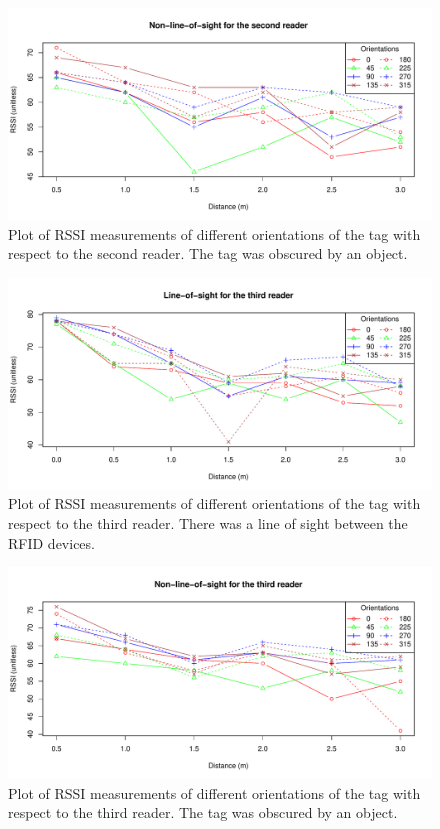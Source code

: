\begin{figure}[H]
	\begin{center}
		\includegraphics[width=1\textwidth]{figures/rssi_distance_3m_nlos_r2}
		\caption{Plot of RSSI measurements of different orientations of the tag with respect to the second reader. The tag was obscured by an object.}
	\end{center}
\end{figure}

\begin{figure}[H]
	\begin{center}
		\includegraphics[width=1\textwidth]{figures/rssi_distance_3m_los_r3}
		\caption{Plot of RSSI measurements of different orientations of the tag with respect to the third reader. There was  a line of sight between the RFID devices.}
	\end{center}
\end{figure}

\begin{figure}[H]
	\begin{center}
		\includegraphics[width=1\textwidth]{figures/rssi_distance_3m_nlos_r3}
		\caption{Plot of RSSI measurements of different orientations of the tag with respect to the third reader. The tag was obscured by an object.}
	\end{center}
\end{figure}

